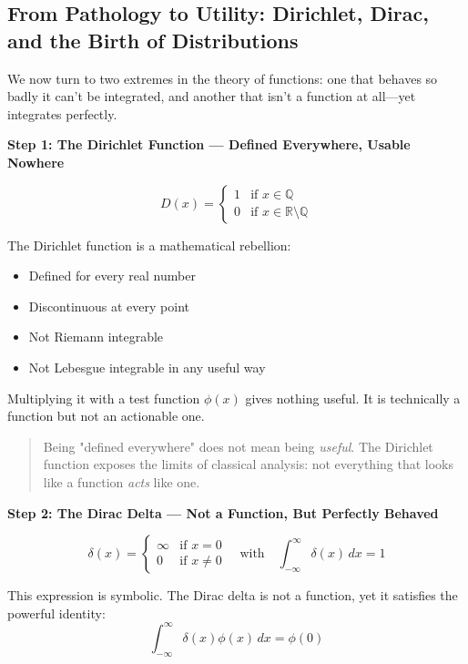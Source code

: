 \subsection{From Pathology to Utility: Dirichlet, Dirac, and the Birth of Distributions}

We now turn to two extremes in the theory of functions: one that behaves so badly it can't be integrated, and another that isn't a function at all---yet integrates perfectly.

\vspace{1em}
\noindent
\textbf{Step 1: The Dirichlet Function --- Defined Everywhere, Usable Nowhere}

\[
D(x) =
\begin{cases}
1 & \text{if } x \in \mathbb{Q} \\
0 & \text{if } x \in \mathbb{R} \setminus \mathbb{Q}
\end{cases}
\]

The Dirichlet function is a mathematical rebellion:
\begin{itemize}
    \item Defined for every real number
    \item Discontinuous at every point
    \item Not Riemann integrable
    \item Not Lebesgue integrable in any useful way
\end{itemize}

Multiplying it with a test function \( \phi(x) \) gives nothing useful. It is technically a function but not an actionable one.

\begin{quote}
Being "defined everywhere" does not mean being \textit{useful}. The Dirichlet function exposes the limits of classical analysis: not everything that looks like a function \textit{acts} like one.
\end{quote}

\vspace{1em}
\noindent
\textbf{Step 2: The Dirac Delta --- Not a Function, But Perfectly Behaved}

\[
\delta(x) =
\begin{cases}
\infty & \text{if } x = 0 \\
0 & \text{if } x \neq 0
\end{cases}
\quad \text{with} \quad \int_{-\infty}^{\infty} \delta(x)\, dx = 1
\]

This expression is symbolic. The Dirac delta is not a function, yet it satisfies the powerful identity:
\[
\int_{-\infty}^{\infty} \delta(x) \phi(x)\, dx = \phi(0)
\]

